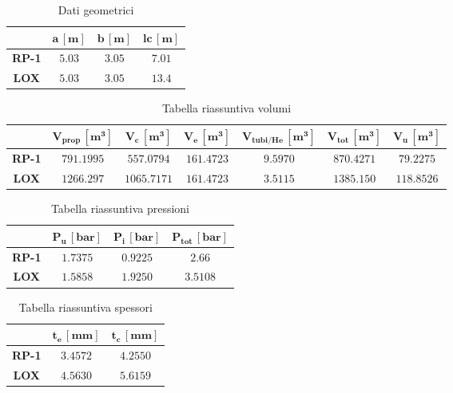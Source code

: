 \begin{table}[H]
\centering
\begin{tabular}{|c|c|c|c|}
\hline
& $\bm{a \, [m]}$ & $\bm{b \, [m]}$ & $\bm{lc \, [m]}$ \\
\hline
\textbf{RP-1} & $5.03$ & $3.05$ & $7.01$ \\
\hline
\textbf{LOX} & $5.03$ & $3.05$ & $13.4$ \\
\hline
\end{tabular}


\caption{Dati geometrici}
\label{table:dati_geometrici}
\end{table}


\begin{table}[H]
\centering
\begin{tabular}{|c|c|c|c|c|c|c|}
\hline
& $\bm{V_{prop} \, [m^3]}$ & $\bm{V_{c} \, [m^3]}$ & $\bm{V_{e} \, [m^3]}$ & $\bm{V_{tubi/He} \, [m^3]}$ & $\bm{V_{tot} \, [m^3]}$ & $\bm{V_{u} \, [m^3]} $\\
\hline
\textbf{RP-1} & $791.1995 $ & $557.0794 $ & $  161.4723 $ & $ 9.5970$ & $ 870.4271$ & $79.2275 $\\
\hline
\textbf{LOX} & $1266.297 $ & $1065.7171 $ & $ 161.4723$ & $3.5115 $ & $ 1385.150$ & $118.8526 $\\
\hline
\end{tabular}
\caption{Tabella riassuntiva volumi}
\label{table:volumi}
\end{table}



\begin{table}
\centering
\begin{tabular}{|c|c|c|c|}
\hline
& $\bm{P_{u} \, [bar]}$ & $\bm{P_{i} \, [bar]}$ & $\bm{P_{tot} \, [bar]}$ \\
\hline
\textbf{RP-1} & $1.7375$ & $0.9225$ & $2.66$ \\
\hline
\textbf{LOX} & $1.5858$ & $1.9250$ & $3.5108$\\
\hline
\end{tabular}
\caption{Tabella riassuntiva pressioni}
\label{table:pressioni}
\end{table}

\begin{table}
\centering
\begin{tabular}{|c|c|c|}
\hline
& $\bm{t_{e} \, [mm]}$ & $\bm{t_{c}\, [mm]}$\\
\hline
\textbf{RP-1} & $3.4572$ & $4.2550$\\
\hline
\textbf{LOX} & $4.5630$ & $5.6159$\\
\hline
\end{tabular}
\caption{Tabella riassuntiva spessori}
\label{table:spessori}
\end{table}


